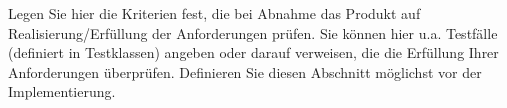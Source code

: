 %                                                                              
%                                                                              
Legen Sie hier die Kriterien fest, die bei Abnahme das Produkt auf Realisierung/Erfüllung der Anforderungen prüfen. Sie können hier u.a. Testfälle (definiert in Testklassen) angeben oder darauf verweisen, die die Erfüllung Ihrer Anforderungen überprüfen. Definieren Sie diesen Abschnitt möglichst vor der Implementierung.
